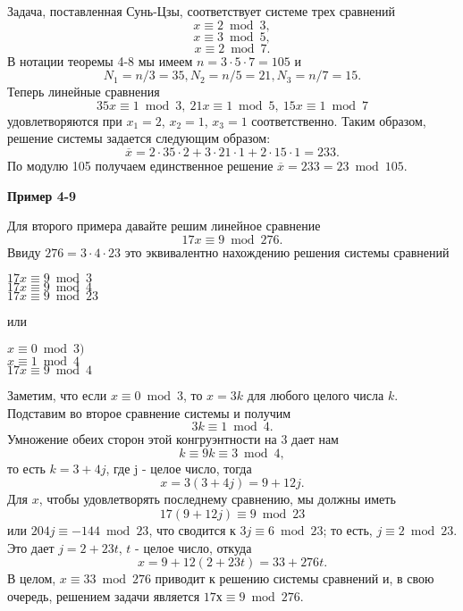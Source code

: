 \documentclass[11pt]{article}
\begin{document}
		Задача, поставленная Сунь-Цзы, соответствует системе трех сравнений
			\[x \equiv 2\bmod{3},\]
			\[x \equiv 3\bmod{5},\]
			\[x \equiv 2\bmod{7}.\]
		В нотации теоремы 4-8 мы имеем $n = 3 \cdot 5 \cdot 7 = 105$ и \[N_{1} = n/3 = 35, N_{2} = n/5 = 21, N_{3} = n/7 = 15.\] Теперь линейные сравнения \[35x\equiv 1\bmod{3},\:21x\equiv 1\bmod{5},\:15x\equiv 1\bmod{7}\]
		удовлетворяются при $x_{1} = 2$, $x_{2} = 1$, $x_{3} = 1$ соответственно. Таким образом, решение системы задается следующим образом: \[\overline{x} = 2\cdot 35\cdot 2 + 3\cdot 21\cdot 1 + 2\cdot 15\cdot 1 = 233.\] По модулю 105 получаем единственное решение $\overline{x} = 233 = 23\bmod{105}$.
		
	\textbf{Пример 4-9}
	
		Для второго примера давайте решим линейное сравнение \[17x\equiv 9\bmod{276}.\]
		Ввиду $276 = 3\cdot 4\cdot 23$ это эквивалентно нахождению решения системы сравнений
		\begin{center}
			\begin{minipage}{0.2\textwidth}
				\begin{flushleft}
					$17x\equiv 9\bmod{3}$\\
					$17x\equiv 9\bmod{4}$\\
					$17x\equiv 9\bmod{23}$\\ 
				\end{flushleft}
			\end{minipage}
		или
			\begin{minipage}{0.2\textwidth}
				\begin{flushright}
					$x\equiv 0\bmod{3})$\\
					$x\equiv 1\bmod{4}$\\
					$17x\equiv 9\bmod{4}$
				\end{flushright}
			\end{minipage}	
		\end{center}
		Заметим, что если $x\equiv 0\bmod{3}$, то $x = 3k$ для любого целого числа $k$. Подставим во второе сравнение системы и получим \[3k\equiv 1\bmod{4}.\]
		Умножение обеих сторон этой конгруэнтности на 3 дает нам \[k\equiv 9k\equiv 3\bmod{4},\] 
		то есть $k = 3 + 4j$, где j - целое число, тогда \[x = 3(3 + 4j) = 9 + 12j.\] Для $x$, чтобы удовлетворять последнему сравнению, мы должны иметь\[17(9 + 12j)\equiv 9\bmod{23}\] 
		или $204j\equiv -144\bmod{23}$, что сводится к $3j\equiv 6\bmod{23}$; то есть, $j\equiv 2\bmod{23}$. Это дает $j = 2 + 23t$, $t$ - целое число, откуда \[x = 9 + 12(2 + 23t) = 33 + 276t.\] В целом, $x\equiv 33\bmod{276}$ приводит к решению системы сравнений и, в свою очередь, решением задачи является $17х\equiv 9\bmod{276}$.
\end{document}
